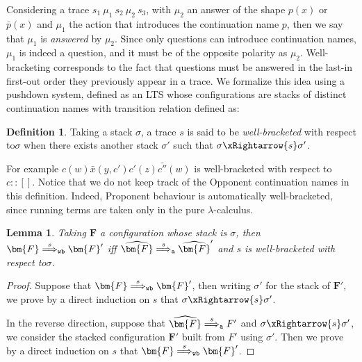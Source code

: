 \documentclass[11pt,a4paper]{amsart}
\theoremstyle{plain}
\theoremstyle{definition}
\theoremstyle{defC}
\theoremstyle{thmC}
\theoremstyle{plain}
\numberwithin{equation}{section}
\newcommand{\wrt}{with respect to\xspace}  %
\newcommand{\tr}{s}
\newcommand{\stt}{\sigma}
\newcommand{\rmm}[1]{{\tt{\lowercase{#1}}}}
\newcommand{\genArr}[2]{\mathrel{\stackrel{{#1}}{\Longrightarrow}_{\rmm{\lowercase{#2}}}}}  %
\newcommand{\ArrA}[1]{\genArr{#1}{A}}  %
\newcommand{\ArrWB}[1]{\genArr{#1}{WB}}          %
\newcommand{\FF}{F}
\newcommand{\FFb}{{\bm{\FF}}} %
\newcommand{\es}{\eraseStack}
\newcommand{\act}{\mu}
\newcommand{\ansP}[2]{\bar{#1}(#2)}
\newcommand{\questP}[2]{\bar{#1}(#2)}
\newcommand{\ansO}[2]{#1(#2)}
\newcommand{\questO}[2]{#1(#2)}
\newcommand{\eraseStack}[1]{\widehat{#1}}
\newcommand{\pshdsym}{\mathsf{pshd}}
\newcommand{\pshdtrans}[1]{\xrightarrow{#1}}%
\newcommand{\pshdTrans}[1]{\xRightarrow{#1}}%
\theoremstyle{plain}
\newtheorem{lemma}[thm]{Lemma}
\theoremstyle{definition}
\newtheorem{definition}[thm]{Definition}
\begin{document}
Considering a trace $\tr_1 \ \act_1  \ \tr_2 \ \act_2 \ \tr_3$,
with $\act_2$ an answer of the shape $\ansO{p}{x}$ or $\ansP{p}{x}$
and $\act_1$ the action that introduces the continuation name $p$,
then we say that $\act_1$ is \emph{answered} by $\act_2$.
Since only questions can introduce continuation names, 
$\act_1$ is indeed a question, and it must be of the opposite polarity
as $\act_2$.
%
Well-bracketing corresponds to the fact that questions must be answered in the last-in
first-out order they previously appear in a trace.
We formalize this idea using a pushdown system, defined as an LTS whose configurations are 
stacks of distinct continuation names with transition relation defined as:

\begin{definition}
Taking a stack $\stt$,
a trace $\tr$ is said to be \emph{well-bracketed} \wrt $\stt$ when
there exists another stack $\stt'$ such that
$\stt \pshdTrans{\tr} \stt'$.
\end{definition}
%
For example $\ansO{c}{w} \questP{x}{y,c'} \ansO{c'}{z} \ansP{c''}{w}$
is well-bracketed \wrt $c::[]$.
Notice that we do not keep track of the Opponent continuation names in this definition.
Indeed, Proponent behaviour is automatically well-bracketed,
since running terms are taken only in the pure $\lambda$-calculus.

\begin{lemma}
\label{l:WBs_lts}
Taking $\FFb$ a configuration whose stack is $\stt$, then
$\FFb \ArrWB{\tr} \FFb'$ iff 
$\es \FFb \ArrA{\tr} \es \FFb'$ and $\tr$ is well-bracketed \wrt $\stt$.
\end{lemma} 

\begin{proof}
  Suppose that $\FFb \ArrWB{\tr} \FFb'$,
  then writing $\stt'$ for the stack of $\FFb'$,
  we prove by a direct induction on $\tr$ that $\stt \pshdTrans{\tr} \stt'$.

  In the reverse direction, suppose that 
  $\es \FFb \ArrA{\tr} \FF'$ and $\stt \pshdTrans{\tr} \stt'$,
  we consider the stacked configuration $\FFb'$ built 
  from $\FF'$ using $\stt'$.
  Then we prove by a direct induction on $\tr$ that
  $\FFb \ArrWB{\tr} \FFb'$.
\end{proof}
\end{document}
